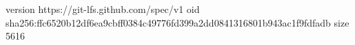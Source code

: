 version https://git-lfs.github.com/spec/v1
oid sha256:ffc6520b12df6ea9cbff0384c49776fd399a2dd0841316801b943ac1f9fdfadb
size 5616
